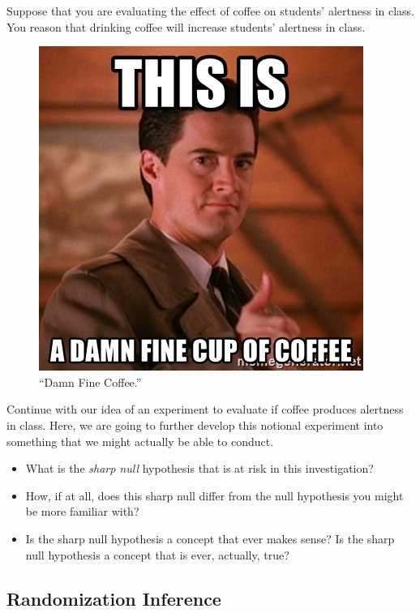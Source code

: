 \documentclass[
]{article}
\providecommand{\tightlist}{%
  \setlength{\itemsep}{0pt}\setlength{\parskip}{0pt}}
\begin{document}
Suppose that you are evaluating the effect of coffee on students' alertness in class. You reason that drinking coffee will increase students' alertness in class.

\begin{figure}
\centering
\includegraphics{./images/damn-fine-coffee.jpeg}
\caption{``Damn Fine Coffee.''}
\end{figure}

Continue with our idea of an experiment to evaluate if coffee produces alertness in class. Here, we are going to further develop this notional experiment into something that we might actually be able to conduct.

\begin{itemize}
\tightlist
\item
  What is the \emph{sharp null} hypothesis that is at risk in this investigation?
\item
  How, if at all, does this sharp null differ from the null hypothesis you might be more familiar with?
\item
  Is the sharp null hypothesis a concept that ever makes sense? Is the sharp null hypothesis a concept that is ever, actually, true?
\end{itemize}

\hypertarget{randomization-inference}{%
\subsection{Randomization Inference}\label{randomization-inference}}
\end{document}
